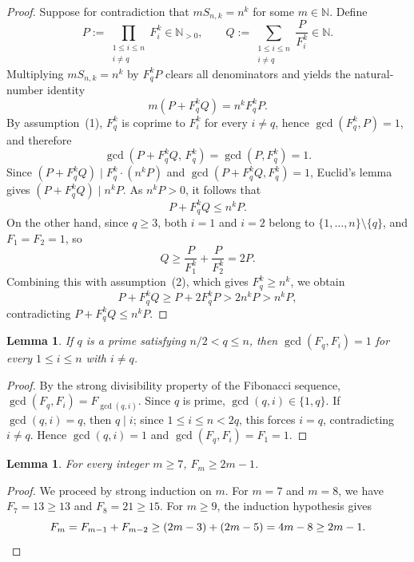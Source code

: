 \documentclass[11pt,a4paper]{article}
\newtheorem{lemma}[theorem]{Lemma}
\begin{document}
\begin{proof}
Suppose for contradiction that $m S_{n,k} = n^k$ for some $m \in \mathbb{N}$. Define
\[
P := \prod_{\substack{1 \le i \le n \\ i \ne q}} F_i^k \in \mathbb{N}_{>0},
\qquad
Q := \sum_{\substack{1 \le i \le n \\ i \ne q}} \frac{P}{F_i^k} \in \mathbb{N}.
\]
Multiplying $m S_{n,k} = n^k$ by $F_q^k P$ clears all denominators and yields the natural-number identity
\[
m (P + F_q^k Q) = n^k F_q^k P.
\]
By assumption~(1), $F_q^k$ is coprime to $F_i^k$ for every $i \ne q$, hence $\gcd(F_q^k, P) = 1$, and therefore
\[
\gcd(P + F_q^k Q,\, F_q^k) = \gcd(P, F_q^k) = 1.
\]
Since $(P + F_q^k Q) \mid F_q^k \cdot (n^k P)$ and $\gcd(P + F_q^k Q, F_q^k) = 1$, Euclid's lemma gives $(P + F_q^k Q) \mid n^k P$. As $n^k P > 0$, it follows that
\[
P + F_q^k Q \le n^k P.
\]
On the other hand, since $q \ge 3$, both $i = 1$ and $i = 2$ belong to $\{1,\dots,n\} \setminus \{q\}$, and $F_1 = F_2 = 1$, so
\[
Q \ge \frac{P}{F_1^k} + \frac{P}{F_2^k} = 2P.
\]
Combining this with assumption~(2), which gives $F_q^k \ge n^k$, we obtain
\[
P + F_q^k Q \ge P + 2 F_q^k P > 2 n^k P > n^k P,
\]
contradicting $P + F_q^k Q \le n^k P$.
\end{proof}

\begin{lemma}\label{lem:prime-coprime}
If $q$ is a prime satisfying $n/2 < q \le n$, then $\gcd(F_q, F_i) = 1$ for every $1 \le i \le n$ with $i \ne q$.
\end{lemma}

\begin{proof}
By the strong divisibility property of the Fibonacci sequence, $\gcd(F_q, F_i) = F_{\gcd(q,i)}$. Since $q$ is prime, $\gcd(q,i) \in \{1,q\}$. If $\gcd(q,i) = q$, then $q \mid i$; since $1 \le i \le n < 2q$, this forces $i = q$, contradicting $i \ne q$. Hence $\gcd(q,i) = 1$ and $\gcd(F_q,F_i) = F_1 = 1$.
\end{proof}

\begin{lemma}\label{lem:fib-linear}
For every integer $m \ge 7$, $F_m \ge 2m - 1$.
\end{lemma}

\begin{proof}
We proceed by strong induction on $m$. For $m = 7$ and $m = 8$, we have $F_7 = 13 \ge 13$ and $F_8 = 21 \ge 15$. For $m \ge 9$, the induction hypothesis gives
\[
F_m = F_{m-1} + F_{m-2} \ge (2m - 3) + (2m - 5) = 4m - 8 \ge 2m - 1. \qedhere
\]
\end{proof}
\end{document}
